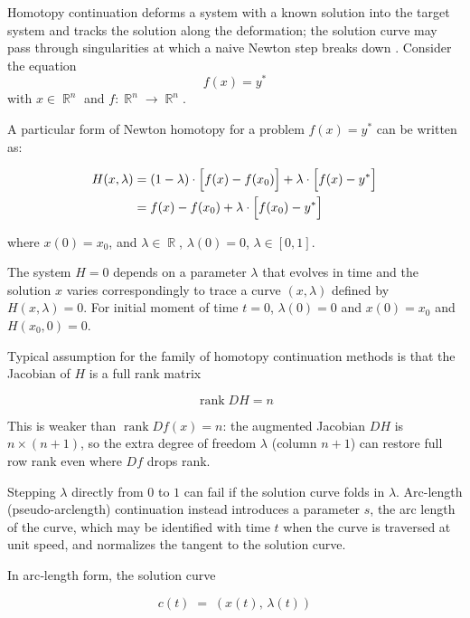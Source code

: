 \documentclass[11pt,american]{article}
\DeclareMathOperator{\R}{\mathbb{R}}
\DeclareMathOperator{\rank}{\operatorname{rank}}
\theoremstyle{definition}
\theoremstyle{plain}
\theoremstyle{remark}
\begin{document}
Homotopy continuation deforms a system with a known solution into the target system and tracks the solution along the deformation; the solution curve may pass through singularities at which a naive Newton step breaks down \cite{AllgowerGeorg1990,SommeseWampler2005}. Consider the equation
\begin{equation}
f(x) = y^*
\end{equation}
with $x \in \R^n$ and $f:\R^n\to\R^n$.

A particular form of Newton homotopy for a problem $f(x) = y^*$ can be written as:

\begin{align}\label{hom_func}
H(x,\lambda) &= (1 - \lambda) \cdot \Bigl[ f(x) - f(x_0) \Bigr] + \lambda \cdot \Bigl[ f(x) - y^* \Bigr] \\
&= f(x) - f(x_0) + \lambda \cdot \Bigl[ f(x_0) - y^* \Bigr] 
\end{align}

where $x(0) = x_0$, and $\lambda \in \R$, $\lambda(0) = 0$, $\lambda \in [0,1]$.

The system $H = 0$ depends on a parameter $\lambda$ that evolves in time and the solution $x$ varies correspondingly to trace a curve $(x, \lambda)$ defined by $H(x, \lambda) = 0$.
For initial moment of time $t = 0$, $\lambda(0) = 0$ and $x(0) = x_0$ and $H(x_0,0) = 0$.

Typical assumption for the family of homotopy continuation methods is that the Jacobian of $H$ is a full rank matrix

\begin{equation}\label{full_rank_H}
\rank D H = n
\end{equation}

This is weaker than $\rank Df(x) = n$: the augmented Jacobian $DH$ is $n\times(n+1)$, so the extra degree of freedom $\lambda$ (column $n+1$) can restore full row rank even where $Df$ drops rank.

Stepping $\lambda$ directly from $0$ to $1$ can fail if the solution curve folds in $\lambda$. Arc-length (pseudo-arclength) continuation instead introduces a parameter $s$, the arc length of the curve, which may be identified with time $t$ when the curve is traversed at unit speed, and normalizes the tangent to the solution curve.

In arc‐length form, the solution curve

\begin{equation}
c(t) \;=\; (x(t),\,\lambda(t))
\end{equation}
\end{document}
